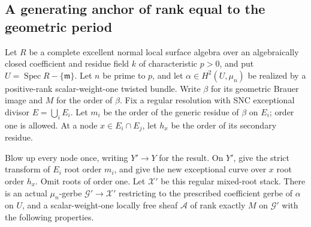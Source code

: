 \subsection{A generating anchor of rank equal to the geometric period}

\begin{proposition}
\label{D:rank-period-generating-root-anchor}
Let \(R\) be a complete excellent normal local surface algebra
over an algebraically closed coefficient and residue field \(k\)
of characteristic \(p>0\), and put
\(U=\operatorname{Spec}R-\{\mathfrak m\}\).
Let \(n\) be prime to \(p\), and let
\(\alpha\in H^2(U,\mu_n)\) be realized by a positive-rank
scalar-weight-one twisted bundle. Write \(\beta\) for its
geometric Brauer image and \(M\) for the order of \(\beta\).
Fix a regular resolution with SNC exceptional divisor
\(E=\bigcup_i E_i\). Let \(m_i\) be the order of the
generic residue of \(\beta\) on \(E_i\); order one is
allowed. At a node \(x\in E_i\cap E_j\), let \(h_x\)
be the order of its secondary residue.

Blow up every node once, writing \(Y'\to Y\) for the
result. On \(Y'\), give the strict transform of \(E_i\)
root order \(m_i\), and give the new exceptional curve
over \(x\) root order \(h_x\). Omit roots of order one.
Let \(\mathcal X'\) be this regular mixed-root stack.
There is an actual \(\mu_n\)-gerbe
\(\mathcal G'\to\mathcal X'\) restricting to the prescribed
coefficient gerbe of \(\alpha\) on \(U\), and a
scalar-weight-one locally free sheaf \(\mathcal A\) of
rank exactly \(M\) on \(\mathcal G'\) with the following
properties.


\end{proposition}
